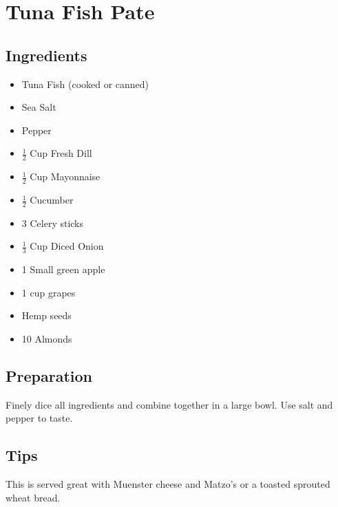 \thispagestyle{fancy}
\section{Tuna Fish Pate} \label{TunaPate}
\AddToShipoutPicture*{\template}

\subsection*{Ingredients}

\begin{multicols}{3}
	\begin{itemize}
		\item Tuna Fish (cooked or canned)
		\item Sea Salt
		\item Pepper
		\item $\frac{1}{2}$ Cup Fresh Dill
		\item $\frac{1}{2}$ Cup Mayonnaise
		\item $\frac{1}{2}$ Cucumber
		\item 3 Celery sticks
		\item $\frac{1}{3}$ Cup Diced Onion
		\item 1 Small green apple
		\item 1 cup grapes
		\item Hemp seeds
		\item 10 Almonds
	\end{itemize}
\end{multicols}

\subsection*{Preparation}

Finely dice all ingredients and combine together in a large bowl. Use salt and pepper to taste. 

\subsection*{Tips}

This is served great with Muenster cheese and Matzo's or a toasted sprouted wheat bread. 